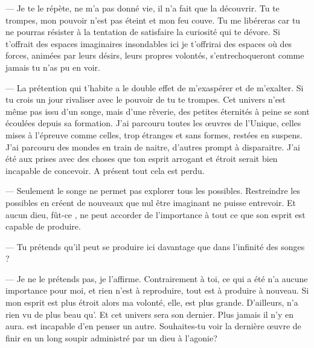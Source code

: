 --- Je te le répète, \Mey ne m'a pas donné vie, il n'a fait que la découvrir. Tu te trompes, mon pouvoir n'est pas éteint et mon feu couve. Tu me libéreras car tu ne pourras résister à la tentation de satisfaire la curiosité qui te dévore. Si \Mey t'offrait des espaces imaginaires insondables ici je t'offrirai des espaces où des forces, animées par leurs désirs, leurs propres volontés, s'entrechoqueront comme jamais tu n'as pu en voir.

--- La prétention qui t'habite a le double effet de m'exaspérer et de m'exalter. Si tu crois un jour rivaliser avec le pouvoir de \Mey tu te trompes. Cet univers n'est même pas issu d'un songe, mais d'une rêverie, des petites éternités à peine se sont écoulées depuis sa formation. J'ai parcouru toutes les œuvres de l'Unique, celles mises à l'épreuve comme celles, trop étranges et sans formes, restées en suspens. J'ai parcouru des mondes en train de naitre, d'autres prompt à disparaitre. J'ai été aux prises avec des choses que ton esprit arrogant et étroit serait bien incapable de concevoir. A présent tout cela est perdu.

--- Seulement le songe ne permet pas explorer tous les possibles. Restreindre les possibles en créent de nouveaux que nul être imaginant ne puisse entrevoir. Et aucun dieu, fût-ce \Mey, ne peut accorder de l'importance à tout ce que son esprit est capable de produire.

--- Tu prétends qu'il peut se produire ici davantage que dans l'infinité des songes ? 

--- Je ne le prétends pas, je l'affirme. Contrairement à toi, ce qui a été n'a aucune importance pour moi, et rien n'est à reproduire, tout est à produire à nouveau. Si mon esprit est plus étroit alors ma volonté, elle, est plus grande. D'ailleurs, \Mey n'a rien vu de plus beau qu'\Auga. Et cet univers sera son dernier. Plus jamais il n'y en aura. \Cind est incapable d'en penser un autre. Souhaites-tu voir la dernière œuvre de \Mey finir en un long soupir administré par un dieu à l'agonie?

